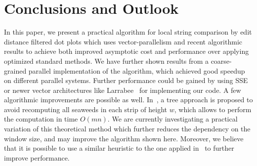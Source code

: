 \documentclass{IOS-Book-Article}     \usepackage{amsmath}
\theoremstyle{plain}
\theoremstyle{definition}
\begin{document}
\section{Conclusions and Outlook}\label{sec:conclusions}
In this paper, we present a practical algorithm for local string comparison by edit distance
filtered dot plots which uses vector-parallelism and recent algorithmic results to achieve both improved
asymptotic cost and performance over applying optimized standard methods. We
have further shown results from a coarse-grained parallel implementation of the
algorithm, which achieved good speedup on different parallel systems.
Further performance could be gained by using SSE~\cite{Intel:09} or newer vector
architectures like Larrabee~\cite{Abrash:09} for implementing our code.
A few algorithmic improvements are possible as well. 
In~\cite{TiskinL:07:Applications}, a tree approach is proposed to avoid
recomputing all seaweeds in each strip of height $w$, which allows to perform
the computation in time $O(mn)$. We are currently investigating a 
practical variation of this theoretical method which further reduces the
dependency on the window size, and may improve the algorithm shown here.
Moreover, we believe that it is possible to use a similar heuristic to the one
applied in~\cite{Ott:09} to further improve performance.
\end{document}
